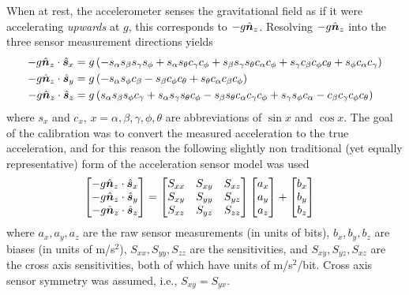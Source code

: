 When at rest, the accelerometer senses the gravitational field as if it were
accelerating \textit{upwards} at $g$, this corresponds to $-g\hat{\boldsymbol{n}}_{z}$.
Resolving $-g\hat{\boldsymbol{n}}_{z}$ into the three sensor measurement directions yields
\begin{align}
  \label{rb:eq:imux}
  -g\uv{n}{z} \cdot \uv{s}{x} &= g \left(- s_{\alpha}
s_{\beta} s_{\gamma}
s_{\phi} + s_{\alpha}
s_{\theta} c_{\gamma}
c_{\phi} + s_{\beta}
s_{\gamma} s_{\theta}
c_{\alpha} c_{\phi} +
s_{\gamma} c_{\beta}
c_{\phi} c_{\theta} +
s_{\phi} c_{\alpha}
c_{\gamma}\right) \\
%
  \label{rb:eq:imuy}
  -g\uv{n}{z} \cdot \uv{s}{y} &= g \left(- s_{\alpha}
s_{\phi} c_{\beta} -
s_{\beta} c_{\phi}
c_{\theta} + s_{\theta}
c_{\alpha} c_{\beta}
c_{\phi}\right) \\
%
  \label{rb:eq:imuz}
  -g\uv{n}{z} \cdot \uv{s}{z} &= g \left(s_{\alpha}
s_{\beta} s_{\phi}
c_{\gamma} + s_{\alpha}
s_{\gamma} s_{\theta}
c_{\phi} - s_{\beta}
s_{\theta} c_{\alpha}
c_{\gamma} c_{\phi} +
s_{\gamma} s_{\phi}
c_{\alpha} - c_{\beta}
c_{\gamma} c_{\phi}
c_{\theta}\right)
\end{align}
where $s_{x}$ and $c_{x}$, $x=\alpha,\beta,\gamma,\phi,\theta$ are
abbreviations of $\sin{x}$ and $\cos{x}$. The goal of the calibration was to
convert the measured acceleration to the true acceleration, and for this reason
the following slightly non traditional (yet equally representative) form of the
acceleration sensor model was used
\begin{align}
  \label{rb:eq:sensormodel}
  \left[
    \begin{matrix}
      -g\hat{\boldsymbol{n}}_{z} \cdot \hat{\boldsymbol{s}}_{x} \\
      -g\hat{\boldsymbol{n}}_{z} \cdot \hat{\boldsymbol{s}}_{y} \\
      -g\hat{\boldsymbol{n}}_{z} \cdot \hat{\boldsymbol{s}}_{z}
    \end{matrix}
  \right]
  &=
  \left[
    \begin{matrix}
      S_{xx} & S_{xy} & S_{xz}\\
      S_{xy} & S_{yy} & S_{yz}\\
      S_{xz} & S_{yz} & S_{zz}
    \end{matrix}
  \right]
  \left[
    \begin{matrix}
      a_{x} \\
      a_{y} \\
      a_{z}
    \end{matrix}
  \right]
  +
  \left[
    \begin{matrix}
      b_{x} \\
      b_{y} \\
      b_{z}
    \end{matrix}
  \right]
\end{align}
where $a_x, a_y, a_z$ are the raw sensor measurements (in units of bits), $b_x,
b_y, b_z$ are biases (in units of m/s$^2$), $S_{xx}, S_{yy}, S_{zz}$ are the
sensitivities, and $S_{xy}, S_{yz}, S_{xz}$ are the cross axis sensitivities,
both of which have units of m/s$^2$/bit. Cross axis sensor symmetry was
assumed, i.e., $S_{xy} = S_{yx}$.

